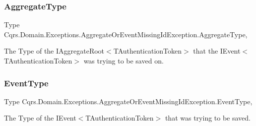 \subsubsection{\texorpdfstring{Aggregate\+Type}{AggregateType}}
{\footnotesize\ttfamily Type Cqrs.\+Domain.\+Exceptions.\+Aggregate\+Or\+Event\+Missing\+Id\+Exception.\+Aggregate\+Type\hspace{0.3cm}{\ttfamily [get]}, {\ttfamily [set]}}



The Type of the I\+Aggregate\+Root$<$\+T\+Authentication\+Token$>$ that the I\+Event$<$\+T\+Authentication\+Token$>$ was trying to be saved on. 

\mbox{\label{classCqrs_1_1Domain_1_1Exceptions_1_1AggregateOrEventMissingIdException_ac9f60e1491680ab596b0501b669a4e1c_ac9f60e1491680ab596b0501b669a4e1c}} 
\subsubsection{\texorpdfstring{Event\+Type}{EventType}}
{\footnotesize\ttfamily Type Cqrs.\+Domain.\+Exceptions.\+Aggregate\+Or\+Event\+Missing\+Id\+Exception.\+Event\+Type\hspace{0.3cm}{\ttfamily [get]}, {\ttfamily [set]}}



The Type of the I\+Event$<$\+T\+Authentication\+Token$>$ that was trying to be saved. 

